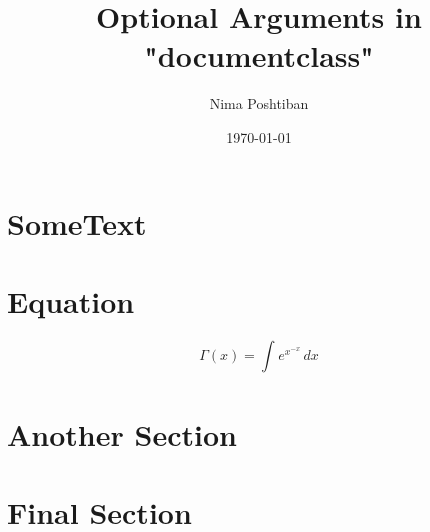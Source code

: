\documentclass[12pt,fleqn,leqno,twocolumn]{article} %
\author{Nima Poshtiban}
\date{\today}
\title{Optional Arguments in "documentclass"}
\begin{document}
	\maketitle
	
\section{SomeText}
\blindtext
\section{Equation}
\begin{equation}
	\Gamma{\left(x\right)} = \int_{}{e^{x^{-x}}\,dx}
\end{equation}
\section{Another Section}
\blindtext
\section{Final Section}
\blindtext
\end{document}
